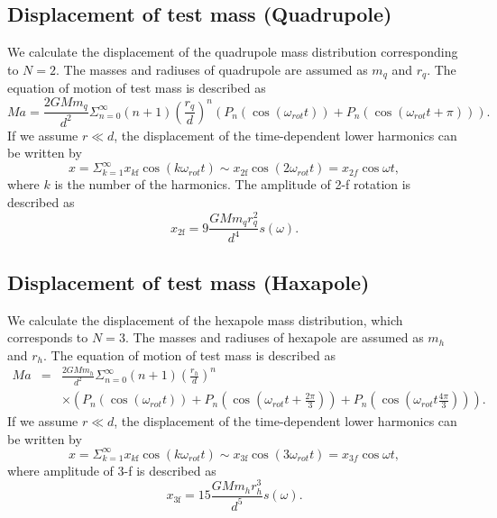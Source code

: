 \documentclass[A4]{spie}  %
\begin{document}
\subsection{Displacement of test mass (Quadrupole)} \label{Quad}
We calculate the displacement of the quadrupole mass distribution corresponding to $N=2$.
The masses and radiuses of quadrupole are assumed as $m_q$ and $r_q$. 
The equation of motion of test mass is described as
\begin{equation}
Ma=\frac{2GMm_q}{d^2}\Sigma^{\infty}_{n=0}(n+1) \left( \frac{r_q}{d} \right)^n \left( P_n\left(\cos{\left(\omega_{rot} t \right)}\right) + P_n\left(\cos{\left(\omega_{rot} t +\pi \right)}\right) \right).
\end{equation} 
If we assume $r \ll d$, the displacement of the time-dependent lower harmonics can be written by 
\begin{equation}
x=\Sigma_{k=1}^{\infty}x_{k\mathrm{f}}\cos(k\omega_{rot} t)\sim x_{2\mathrm{f}}\cos(2\omega_{rot} t)=x_{2f}\cos{\omega t},
\end{equation}
where $k$ is the number of the harmonics. 
The amplitude of 2-f rotation is described as
\begin{equation}
x_{2\mathrm{f}}=9\frac{GMm_{q}r_{q}^2}{d^4}s(\omega). \label{2f}
\end{equation}

\subsection{Displacement of test mass (Haxapole)} \label{Hexa}
We calculate the displacement of the hexapole mass distribution, which corresponds to $N=3$.
The masses and radiuses of hexapole are assumed as $m_h$ and $r_h$. 
The equation of motion of test mass is described as
\begin{eqnarray}
Ma &=& \frac{2GMm_h}{d^2}\Sigma^{\infty}_{n=0}(n+1) \left( \frac{r_h}{d} \right)^n \nonumber \\ 
&&\times \left( P_n\left(\cos{\left(\omega_{rot} t \right)}\right) + P_n\left(\cos{\left(\omega_{rot} t+\frac{2\pi}{3} \right)} \right) + P_n\left(\cos{\left(\omega_{rot} t \frac{4\pi}{3} \right) }\right) \right).
\end{eqnarray} 
If we assume $r \ll d$, the displacement of the time-dependent lower harmonics can be written by 
\begin{equation}
x=\Sigma_{k=1}^{\infty}x_{k\mathrm{f}}\cos(k\omega_{rot} t)\sim  x_{3\mathrm{f}}\cos(3\omega_{rot} t)=x_{3f}\cos{\omega t},
\end{equation}
where amplitude of 3-f is described as
\begin{equation}
 x_{3\mathrm{f}}=15\frac{GMm_{h}r_{h}^3}{d^5}s(\omega). \label{3f}
\end{equation}
\end{document}

